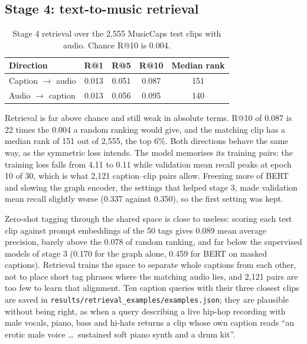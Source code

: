 \documentclass{article}
\begin{document}
\subsection{Stage 4: text-to-music retrieval}
\label{sec:res-retrieval}

\begin{table}[t]
  \caption{Stage 4 retrieval over the 2,555 MusicCaps test clips with audio. Chance R@10 is 0.004.}
  \label{tab:retrieval}
  \centering
  \small
  \begin{tabular}{lcccc}
    \toprule
    Direction & R@1 & R@5 & R@10 & Median rank \\
    \midrule
    Caption $\to$ audio & 0.013 & 0.051 & 0.087 & 151 \\
    Audio $\to$ caption & 0.013 & 0.056 & 0.095 & 140 \\
    \bottomrule
  \end{tabular}
\end{table}

Retrieval is far above chance and still weak in absolute terms. R@10 of 0.087 is 22 times the 0.004 a random ranking
would give, and the matching clip has a median rank of 151 out of 2,555, the top 6\%. Both directions behave the same
way, as the symmetric loss intends. The model memorises its training pairs: the training loss falls from 4.11 to 0.11
while validation mean recall peaks at epoch 10 of 30, which is what 2,121 caption--clip pairs allow. Freezing more of
BERT and slowing the graph encoder, the settings that helped stage 3, made validation mean recall slightly worse
(0.337 against 0.350), so the first setting was kept.

Zero-shot tagging through the shared space is close to useless: scoring each test clip against prompt embeddings of
the 50 tags gives 0.089 mean average precision, barely above the 0.078 of random ranking, and far below the supervised
models of stage 3 (0.170 for the graph alone, 0.459 for BERT on masked captions). Retrieval trains the space to
separate whole captions from each other, not to place short tag phrases where the matching audio lies, and 2,121 pairs
are too few to learn that alignment. Ten caption queries with their three closest clips are saved in
\texttt{results/retrieval\_examples/examples.json}; they are plausible without being right, as when a query describing a
live hip-hop recording with male vocals, piano, bass and hi-hats returns a clip whose own caption reads ``an erotic
male voice \dots\ sustained soft piano synth and a drum kit''.
\end{document}
